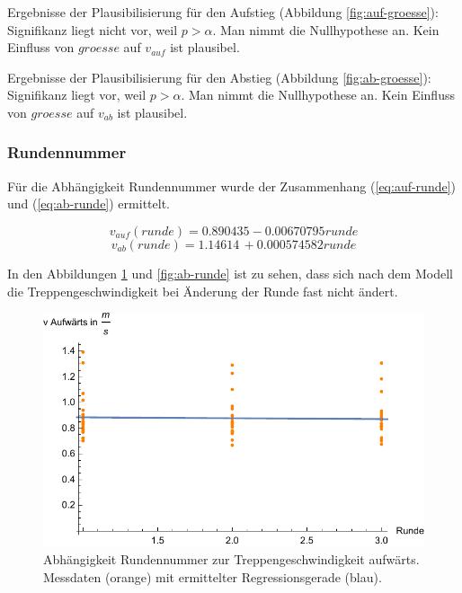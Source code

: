 Ergebnisse der Plausibilisierung für den Aufstieg 
(Abbildung \ref{fig:auf-groesse}):
Signifikanz liegt nicht vor, weil $p > \alpha$. Man nimmt die
Nullhypothese an. Kein Einfluss von $groesse$ auf $v_{auf}$ ist plausibel.

Ergebnisse der Plausibilisierung für den Abstieg
(Abbildung \ref{fig:ab-groesse}):
Signifikanz liegt vor, weil $p > \alpha$. Man nimmt die
Nullhypothese an. Kein Einfluss von $groesse$ auf $v_{ab}$ ist plausibel.


\subsubsection{Rundennummer}


Für die Abhängigkeit Rundennummer wurde 
der Zusammenhang (\ref{eq:auf-runde}) und (\ref{eq:ab-runde}) ermittelt.

\begin{equation} \label{eq:auf-runde}
v_{auf}(runde) = 0.890435 - 0.00670795 runde
\end{equation}
\begin{equation} \label{eq:ab-runde}
v_{ab}(runde) = 1.14614\, +0.000574582 runde
\end{equation}

In den Abbildungen \ref{fig:auf-runde} und \ref{fig:ab-runde} ist 
zu sehen, dass sich nach dem Modell die Treppengeschwindigkeit bei Änderung der Runde fast nicht ändert. 

\begin{figure} \centering 
	\includegraphics[]{abbildungen/regression/2017/auf-runde.pdf}
	
	\caption{Abhängigkeit Rundennummer zur Treppengeschwindigkeit aufwärts. Messdaten (orange) mit ermittelter Regressionsgerade (blau). \label{fig:auf-runde}}
\end{figure}

